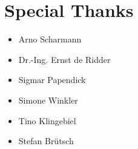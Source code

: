\documentclass[10pt,a4paper, titlepage, toc=idx]{scrreprt}
\theoremstyle{definition}
\theoremstyle{plain}
\begin{document}
	\section{Special Thanks}
	\begin{itemize}[label=]
        \item Arno Scharmann
        \item Dr.-Ing. Ernst de Ridder
        \item Sigmar Papendick
        \item Simone Winkler
        \item Tino Klingebiel
        \item Stefan Brütsch
	\end{itemize}
      
\end{document}
